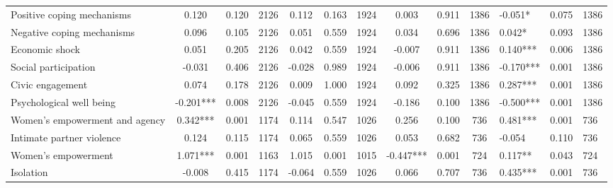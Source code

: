 \begin{tabular}{l*{9}{c}}
 Positive coping mechanisms &        0.120 &        0.120 & 2126       &        0.112 &        0.163 & 1924 &        0.003 &        0.911 & 1386 &       -0.051* &        0.075 & 1386 \\ 

 Negative coping mechanisms &        0.096 &        0.105 & 2126       &        0.051 &        0.559 & 1924 &        0.034 &        0.696 & 1386 &        0.042* &        0.093 & 1386 \\ 

 Economic shock &        0.051 &        0.205 & 2126       &        0.042 &        0.559 & 1924 &       -0.007 &        0.911 & 1386 &        0.140*** &        0.006 & 1386 \\ 

 Social participation &       -0.031 &        0.406 & 2126       &       -0.028 &        0.989 & 1924 &       -0.006 &        0.911 & 1386 &       -0.170*** &        0.001 & 1386 \\ 

 Civic engagement &        0.074 &        0.178 & 2126       &        0.009 &        1.000 & 1924 &        0.092 &        0.325 & 1386 &        0.287*** &        0.001 & 1386 \\ 

 Psychological well being &       -0.201*** &        0.008 & 2126       &       -0.045 &        0.559 & 1924 &       -0.186 &        0.100 & 1386 &       -0.500*** &        0.001 & 1386 \\ 

 Women's empowerment and agency &        0.342*** &        0.001 & 1174       &        0.114 &        0.547 & 1026 &        0.256 &        0.100 & 736 &        0.481*** &        0.001 & 736 \\ 

 Intimate partner violence &        0.124 &        0.115 & 1174       &        0.065 &        0.559 & 1026 &        0.053 &        0.682 & 736 &       -0.054 &        0.110 & 736 \\ 

 Women's empowerment &        1.071*** &        0.001 & 1163       &        1.015 &        0.001 & 1015 &       -0.447*** &        0.001 & 724 &        0.117** &        0.043 & 724 \\ 

 Isolation &       -0.008 &        0.415 & 1174       &       -0.064 &        0.559 & 1026 &        0.066 &        0.707 & 736 &        0.435*** &        0.001 & 736 \\ 


\end{tabular}
